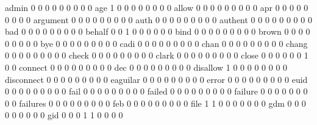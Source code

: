 \documentclass[compress,8pt]{beamer}
\begin{document}
\begin{frame}
\begin{Schunk}
  admin                                      0   0   0   0   0   0   0   0   0
  age                                        1   0   0   0   0   0   0   0   0
  allow                                      0   0   0   0   0   0   0   0   0
  apr                                        0   0   0   0   0   0   0   0   0
  argument                                   0   0   0   0   0   0   0   0   0
  auth                                       0   0   0   0   0   0   0   0   0
  authent                                    0   0   0   0   0   0   0   0   0
  bad                                        0   0   0   0   0   0   0   0   0
  behalf                                     0   0   1   0   0   0   0   0   0
  bind                                       0   0   0   0   0   0   0   0   0
  brown                                      0   0   0   0   0   0   0   0   0
  bye                                        0   0   0   0   0   0   0   0   0
  cadi                                       0   0   0   0   0   0   0   0   0
  chan                                       0   0   0   0   0   0   0   0   0
  chang                                      0   0   0   0   0   0   0   0   0
  check                                      0   0   0   0   0   0   0   0   0
  clark                                      0   0   0   0   0   0   0   0   0
  close                                      0   0   0   0   0   0   1   0   0
  connect                                    0   0   0   0   0   0   0   0   0
  dec                                        0   0   0   0   0   0   0   0   0
  disallow                                   1   0   0   0   0   0   0   0   0
  disconnect                                 0   0   0   0   0   0   0   0   0
  eaguilar                                   0   0   0   0   0   0   0   0   0
  error                                      0   0   0   0   0   0   0   0   0
  euid                                       0   0   0   0   0   0   0   0   0
  fail                                       0   0   0   0   0   0   0   0   0
  failed                                     0   0   0   0   0   0   0   0   0
  failure                                    0   0   0   0   0   0   0   0   0
  failures                                   0   0   0   0   0   0   0   0   0
  feb                                        0   0   0   0   0   0   0   0   0
  file                                       1   1   0   0   0   0   0   0   0
  gdm                                        0   0   0   0   0   0   0   0   0
  gid                                        0   0   0   1   1   0   0   0   0

\end{Schunk}
\end{frame}
\end{document}
